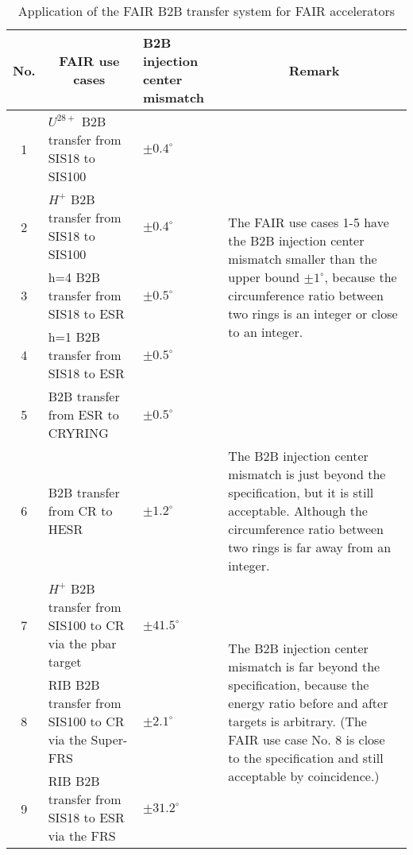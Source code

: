 \begin{table}[!htb]
\newcommand{\tabincell}[2]{\begin{tabular}{@{}#1@{}}#2\end{tabular}}
\caption{Application of the FAIR B2B transfer system for FAIR accelerators}
\label{use_application}
\begin{center}

    \begin{tabular}{ | c | p{4cm}|  p{2cm} |p{6cm} |}
    \hline
     	No. & \multicolumn{1}{|c|}{FAIR use cases} & B2B injection center mismatch & \multicolumn{1}{|c|}{Remark} \\ \hline
1&	$U^{28+}$ B2B transfer from SIS18 to SIS100	&	$\pm0.4^\circ$ 	& \multirow{5}{*}{\parbox{6cm}{The FAIR use cases 1-5 have the B2B injection center mismatch smaller than the upper bound $\pm1^\circ$, because the circumference ratio between two rings is an integer or close to an integer.}}\\ \cline{1-2}
2&$H^{+}$ B2B transfer from SIS18 to SIS100	&	$\pm0.4^\circ$	&	\\ \cline{1-3}
3&h=4 B2B transfer from SIS18 to ESR				&	$\pm0.5^\circ$	&	\\ \cline{1-3}
4&h=1 B2B transfer from SIS18 to ESR				&	$\pm0.5^\circ$	&  \\ \cline{1-3}
5&B2B transfer from ESR to CRYRING				&	$\pm0.5^\circ$	&	\\ \hline
6&B2B transfer from CR to HESR	&$\pm1.2^\circ$ & The B2B injection center mismatch is just beyond the specification, but it is still acceptable. Although the circumference ratio between two rings is far away from an integer.\\ \hline

7&$H^{+}$ B2B transfer from SIS100 to CR via the pbar target			&$\pm41.5^\circ$& \multirow{5}{*}{\parbox{6cm}{The B2B injection center mismatch is far beyond the specification, because the energy ratio before and after targets is arbitrary. (The FAIR use case No. 8 is close to the specification and still acceptable by coincidence.)}}\\ \cline{1-3}
8&RIB B2B transfer from SIS100 to CR via the Super-FRS					&	$\pm2.1^\circ$	& \\ \cline{1-3}

9&RIB B2B transfer from SIS18 to ESR via the FRS	&$\pm31.2^\circ$	&		\\ \hline

    \end{tabular}
\end{center}
\end{table}

